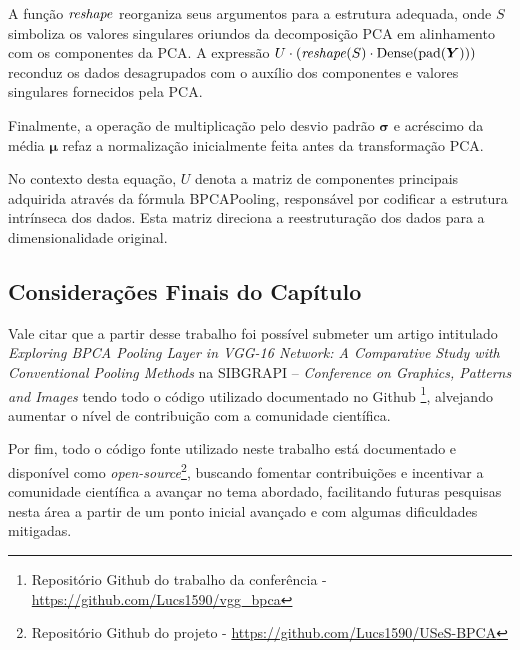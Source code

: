 A função $\text{\textit{reshape}}$ reorganiza seus argumentos para a estrutura adequada, onde $S$ simboliza os valores singulares oriundos da decomposição PCA em alinhamento com os componentes da PCA. A expressão $U \cdot (\text{\textit{reshape}}(S) \cdot \text{Dense}(\text{pad}(\boldsymbol{Y})))$ reconduz os dados desagrupados com o auxílio dos componentes e valores singulares fornecidos pela PCA.

Finalmente, a operação de multiplicação pelo desvio padrão $\boldsymbol{\sigma}$ e acréscimo da média $\boldsymbol{\mu}$ refaz a normalização inicialmente feita antes da transformação PCA.

No contexto desta equação, $U$ denota a matriz de componentes principais adquirida através da fórmula BPCAPooling, responsável por codificar a estrutura intrínseca dos dados. Esta matriz direciona a reestruturação dos dados para a dimensionalidade original.


\subsection{Considerações Finais do Capítulo}
\label{conclusion:final}
Vale citar que a partir desse trabalho foi possível submeter um artigo intitulado \textit{Exploring BPCA Pooling Layer in VGG-16 Network: A Comparative Study with Conventional Pooling Methods} na SIBGRAPI – \textit{Conference on Graphics, Patterns and Images} tendo todo o código utilizado documentado no Github \footnote{Repositório Github do trabalho da conferência - \url{https://github.com/Lucs1590/vgg_bpca}}, alvejando aumentar o nível de contribuição com a comunidade científica.

Por fim, todo o código fonte utilizado neste trabalho está documentado e disponível como \textit{open-source}\footnote{Repositório Github do projeto - \url{https://github.com/Lucs1590/USeS-BPCA}}, buscando fomentar contribuições e incentivar a comunidade científica a avançar no tema abordado, facilitando futuras pesquisas nesta área a partir de um ponto inicial avançado e com algumas dificuldades mitigadas.
